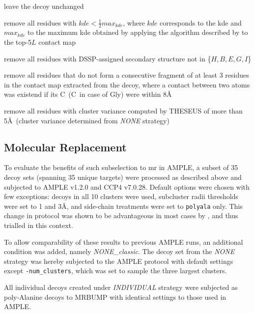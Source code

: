 \begin{description}[style=multiline,leftmargin=4cm]
    \item[default] leave the decoy unchanged
    \item[domain] remove all residues with $kde<\frac{1}{2}max_{kde}$, where $kde$ corresponds to the \gls{kde} and $max_{kde}$ to the maximum \gls{kde} obtained by applying the algorithm described by \textcite{Sadowski2013-zu} to the top-5$L$ contact map
    \item[dssp] remove all residues with DSSP-assigned secondary structure \cite{Frishman1995-si} not in \{$H, B, E, G, I$\}
    \item[fragment] remove all residues that do not form a consecutive fragment of at least 3 residues in the contact map extracted from the decoy, where a contact between two atoms was existend if its C\textbeta\ (C\textalpha\ in case of Gly) were within 8\AA
    \item[variance] remove all residues with cluster variance computed by THESEUS \cite{Theobald2006-qj} of more than 5\AA\ (cluster variance determined from \textit{NONE} strategy)
\end{description}

\subsection{Molecular Replacement} \label{subsec:ample_decoys_methods_mr}
To evaluate the benefits of such subselection to \gls{mr} in AMPLE, a subset of 35 decoy sets (spanning 35 unique targets) were processed as described above and subjected to AMPLE v1.2.0 and CCP4 v7.0.28. Default options were chosen with few exceptions: decoys in all 10 clusters were used, subcluster radii thresholds were set to 1 and 3\AA, and side-chain treatments were set to \texttt{polyala} only. This change in protocol was shown to be advantageous in most cases by \textcite{Thomas2017-qu}, and thus trialled in this context. 

To allow comparability of these results to previous AMPLE runs, an additional condition was added, namely \textit{NONE\_classic}. The decoy set from the \textit{NONE} strategy was hereby subjected to the AMPLE protocol with default settings except \texttt{-num\_clusters}, which was set to sample the three largest clusters.

All individual decoys created under \textit{INDIVIDUAL} strategy were subjected as poly-Alanine decoys to MRBUMP \cite{Keegan2018-kn} with identical settings to those used in AMPLE. 


